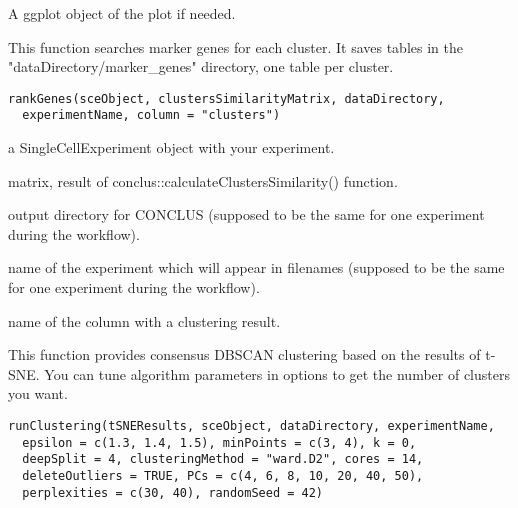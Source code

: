 \documentclass[a4paper]{book}
\begin{document}
%
\begin{Value}
A ggplot object of the plot if needed.
\end{Value}
%
\begin{Description}\relax
This function searches marker genes for each cluster. It saves tables in the "dataDirectory/marker\_genes" directory,
one table per cluster.
\end{Description}
%
\begin{Usage}
\begin{verbatim}
rankGenes(sceObject, clustersSimilarityMatrix, dataDirectory,
  experimentName, column = "clusters")
\end{verbatim}
\end{Usage}
%
\begin{Arguments}
\begin{ldescription}
\item[\code{sceObject}] a SingleCellExperiment object with your experiment.

\item[\code{clustersSimilarityMatrix}] matrix, result of conclus::calculateClustersSimilarity() function.

\item[\code{dataDirectory}] output directory for CONCLUS (supposed to be the same for one experiment during the workflow).

\item[\code{experimentName}] name of the experiment which will appear in filenames (supposed to be the same for one experiment during the workflow).

\item[\code{column}] name of the column with a clustering result.
\end{ldescription}
\end{Arguments}
%
\begin{Description}\relax
This function provides consensus DBSCAN clustering based on the results of t-SNE. 
You can tune algorithm parameters in options to get the number of clusters you want.
\end{Description}
%
\begin{Usage}
\begin{verbatim}
runClustering(tSNEResults, sceObject, dataDirectory, experimentName,
  epsilon = c(1.3, 1.4, 1.5), minPoints = c(3, 4), k = 0,
  deepSplit = 4, clusteringMethod = "ward.D2", cores = 14,
  deleteOutliers = TRUE, PCs = c(4, 6, 8, 10, 20, 40, 50),
  perplexities = c(30, 40), randomSeed = 42)
\end{verbatim}
\end{Usage}
\end{document}
